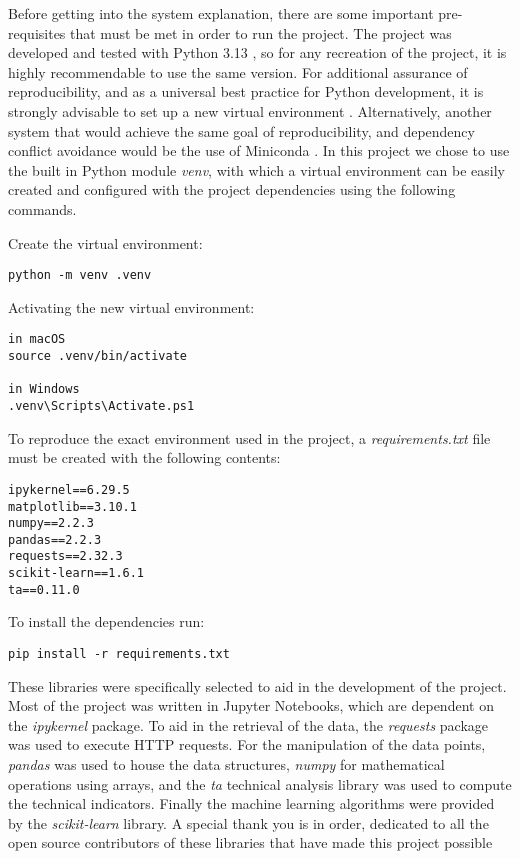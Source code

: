 \documentclass[12pt]{report} %
\begin{document}
Before getting into the system explanation, there are some important pre-requisites that must be met in order to run the project. The project was developed and tested with Python 3.13 \cite{python3.13}, so for any recreation of the project, it is highly recommendable to use the same version. For additional assurance of reproducibility, and as a universal best practice for Python development, it is strongly advisable to set up a new virtual environment \cite{python_venv}. Alternatively, another system that would achieve the same goal of reproducibility, and dependency conflict avoidance would be the use of Miniconda \cite{conda}. In this project we chose to use the built in Python module \textit{venv}, with which a virtual environment can be easily created and configured with the project dependencies using the following commands.

\noindent Create the virtual environment:
\begin{verbatim}
python -m venv .venv
\end{verbatim}

\noindent Activating the new virtual environment:
\begin{verbatim}
in macOS
source .venv/bin/activate

in Windows
.venv\Scripts\Activate.ps1
\end{verbatim}

\noindent To reproduce the exact environment used in the project, a \textit{requirements.txt} file must be created with the following contents:
\begin{verbatim}
ipykernel==6.29.5
matplotlib==3.10.1
numpy==2.2.3
pandas==2.2.3
requests==2.32.3
scikit-learn==1.6.1
ta==0.11.0
\end{verbatim}

\noindent To install the dependencies run:
\begin{verbatim}
pip install -r requirements.txt 
\end{verbatim}

These libraries were specifically selected to aid in the development of the project. Most of the project was written in Jupyter Notebooks, which are dependent on the \textit{ipykernel} package. To aid in the retrieval of the data, the \textit{requests} package was used to execute HTTP requests. For the manipulation of the data points, \textit{pandas} was used to house the data structures, \textit{numpy} for mathematical operations using arrays, and the \textit{ta} technical analysis library was used to compute the technical indicators. Finally the machine learning algorithms were provided by the \textit{scikit-learn} library. A special thank you is in order, dedicated to all the open source contributors of these libraries that have made this project possible
\end{document}
